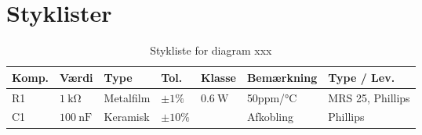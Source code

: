 \chapter{Styklister} \label{bilag:styklister}

\begin{table}[h!]
\small
\centering
\caption{Stykliste for diagram xxx}
\label{tab:udstyr}
\begin{threeparttable}
\begin{tabular}{ l l l l l l l }
\toprule
\multicolumn{1}{l}{\textbf{Komp.}}       &
\multicolumn{1}{l}{\textbf{Værdi}}       &
\multicolumn{1}{l}{\textbf{Type}}       &
\multicolumn{1}{l}{\textbf{Tol.}} &
\multicolumn{1}{l}{\textbf{Klasse}} &
\multicolumn{1}{l}{\textbf{Bemærkning}} &
\multicolumn{1}{l}{\textbf{Type / Lev.}}  \\ 
\hline
R1 & $\SI{1}{\kilo\ohm}$			& Metalfilm		& $\pm 1\%$ 		 & $\SI{0,6}{\watt}$	  & 50ppm/\si{\celsius}  & MRS 25, Phillips \\
C1 & $\SI{100}{\nano\farad}$ & Keramisk & $\pm 10\%$ &  & Afkobling & Phillips \\
\hline
\bottomrule
\end{tabular}
\end{threeparttable}
\end{table} 